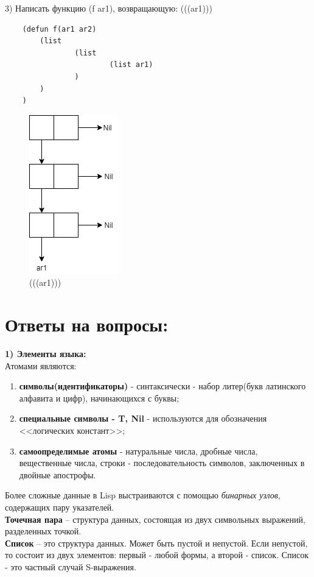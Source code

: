 \documentclass[a4paper, 12pt]{article}
\begin{document}
3) Написать функцию (f ar1), возвращающую: (((ar1)))
\begin{lstlisting}
	(defun f(ar1 ar2)
		(list
				(list 
						(list ar1)
				)
		)
	)
\end{lstlisting}
\clearpage
\newpage
\begin{figure}[h!]
	\centering \includegraphics[scale=1]{3}
	\centering\caption{(((ar1)))}
\end{figure}

\section*{Ответы на вопросы:}
\textbf{1) Элементы языка:}
	\\ Атомами являются:
\begin{enumerate}
	\item \textbf{символы(идентификаторы)} - синтаксически - набор литер(букв латинского алфавита и цифр), начинающихся с буквы;
	\item \textbf{специальные символы - {T, Nil}} - используются для обозначения <<логических констант>>;
	\item \textbf{самоопределимые атомы} - натуральные числа, дробные числа, вещественные числа, строки - последовательность символов, заключенных в двойные апострофы.
\end{enumerate}
\hspace*{5mm} Более сложные данные в Lisp выстраиваются с помощью \textit{бинарных узлов}, содержащих пару указателей.
\\ \hspace*{5mm} \textbf{Точечная пара} – структура данных, состоящая из двух символьных выражений, разделенных точкой.
\\ \hspace*{5mm} \textbf{Список} – это структура данных. Может быть пустой и непустой. Если непустой,
то состоит из двух элементов: первый - любой формы, а второй - список. Список - это частный случай S-выражения.\cite{com}
\end{document}
